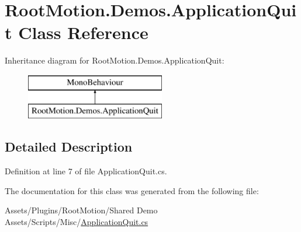 \hypertarget{class_root_motion_1_1_demos_1_1_application_quit}{}\section{Root\+Motion.\+Demos.\+Application\+Quit Class Reference}
\label{class_root_motion_1_1_demos_1_1_application_quit}
Inheritance diagram for Root\+Motion.\+Demos.\+Application\+Quit\+:\begin{figure}[H]
\begin{center}
\leavevmode
\includegraphics[height=2.000000cm]{class_root_motion_1_1_demos_1_1_application_quit}
\end{center}
\end{figure}


\subsection{Detailed Description}


Definition at line 7 of file Application\+Quit.\+cs.



The documentation for this class was generated from the following file\+:\begin{DoxyCompactItemize}
\item 
Assets/\+Plugins/\+Root\+Motion/\+Shared Demo Assets/\+Scripts/\+Misc/\mbox{\hyperlink{_application_quit_8cs}{Application\+Quit.\+cs}}\end{DoxyCompactItemize}
